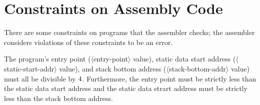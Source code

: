 \documentclass[11pt,letterpaper]{article}
\renewcommand{\nonterm}[1]{\mbox{$\langle$\textrm{#1}$\rangle$}}
\begin{document}
\section{Constraints on Assembly Code}

There are some constraints on programs that the assembler checks;
the assembler considers violations of these constraints to be an error.

The program's entry point (\nonterm{entry-point} value),
static data start address (\nonterm{static-start-addr} value),
and stack bottom address (\nonterm{stack-bottom-addr} value)
must all be divisible by $4$.
Furthermore, the entry point must be strictly less than the static
data start address and the static data strart address must be strictly
less than the stack bottom address.



\end{document}
